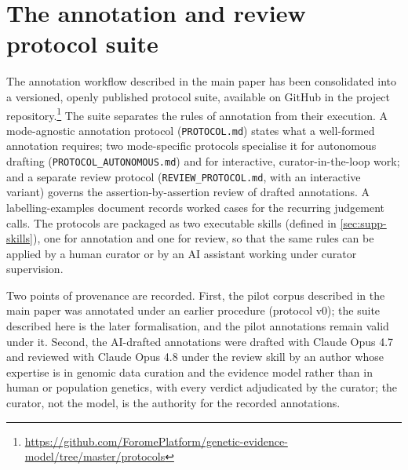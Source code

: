 \section{The annotation and review protocol suite}
\label{sec:supp-protocol-suite}

The annotation workflow described in the main paper has been
consolidated into a versioned, openly published protocol suite,
available on GitHub in the project
repository.\footnote{\url{https://github.com/ForomePlatform/genetic-evidence-model/tree/master/protocols}}
The suite separates the rules of
annotation from their execution. A mode-agnostic annotation protocol
(\texttt{PROTOCOL.md}) states what a well-formed annotation requires;
two mode-specific protocols specialise it for autonomous drafting
(\texttt{PROTOCOL\_AUTONOMOUS.md}) and for interactive,
curator-in-the-loop work; and a separate review protocol
(\texttt{REVIEW\_PROTOCOL.md}, with an interactive variant) governs the
assertion-by-assertion review of drafted annotations. A
labelling-examples document records worked cases for the recurring
judgement calls. The protocols are packaged as two executable skills
(defined in \cref{sec:supp-skills}), one for annotation and one for
review, so that the same rules can be applied by a human curator or by
an AI assistant working under curator supervision.

Two points of provenance are recorded. First, the pilot corpus
described in the main paper was annotated under an earlier procedure
(protocol v0); the suite described here is the later formalisation, and
the pilot annotations remain valid under it. Second, the AI-drafted
annotations were drafted with Claude Opus 4.7 and reviewed with Claude
Opus 4.8 under the review skill by an author whose expertise is in
genomic data curation and the evidence model rather than in human
or population genetics, with every verdict adjudicated by the curator; the
curator, not the model, is the authority for the recorded annotations.

